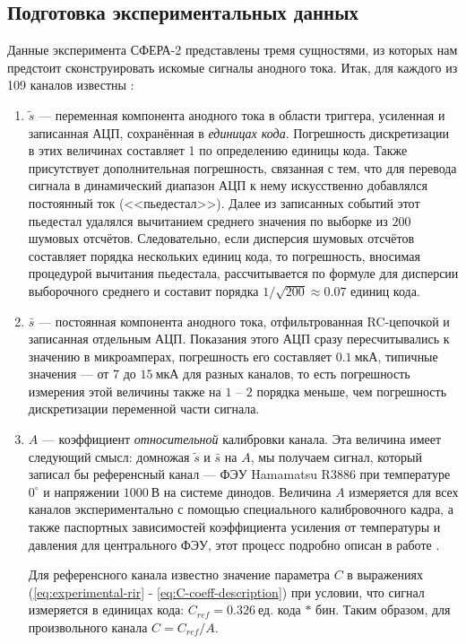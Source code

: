 \subsection{Подготовка экспериментальных данных}
\label{sec:expdata-preparation-for-deconvolution}

Данные эксперимента СФЕРА-2 представлены тремя сущностями, из которых нам предстоит сконструировать искомые сигналы анодного тока. Итак, для каждого из 109 каналов известны \cite{SphereDetector2020}:

\begin{enumerate}
	\item $\tilde{s}$ --- переменная компонента анодного тока в области триггера, усиленная и записанная АЦП, сохранённая в \textit{единицах кода}. Погрешность дискретизации в этих величинах составляет 1 по определению единицы кода. Также присутствует дополнительная погрешность, связанная с тем, что для перевода  сигнала в динамический диапазон АЦП к нему искусственно добавлялся постоянный ток (<<пьедестал>>). Далее из записанных событий этот пьедестал удалялся вычитанием среднего значения по выборке из $200$ шумовых отсчётов. Следовательно, если дисперсия шумовых отсчётов составляет порядка нескольких единиц кода, то погрешность, вносимая процедурой вычитания пьедестала, рассчитывается по формуле для дисперсии выборочного среднего и составит порядка $1 / \sqrt{200} \approx 0.07$ единиц кода.
	
	\item $\bar{s}$ --- постоянная компонента анодного тока, отфильтрованная RC-цепочкой и записанная отдельным АЦП. Показания этого АЦП сразу пересчитывались к значению в микроамперах, погрешность его составляет $0.1~\text{мкА}$, типичные значения --- от $7$ до $15~\text{мкА}$ для разных каналов, то есть погрешность измерения этой величины также на $1$ -- $2$ порядка меньше, чем погрешность дискретизации переменной части сигнала.
	
	\item $A$ --- коэффициент \textit{относительной} калибровки канала. Эта величина имеет следующий смысл: домножая $\tilde{s}$ и $\bar{s}$ на $A$, мы получаем сигнал, который записал бы референсный канал --- ФЭУ Hamamatsu R3886 при температуре $0^{\circ}$ и напряжении $1000~\text{В}$ на системе динодов. Величина $A$ измеряется для всех каналов экспериментально с помощью специального калибровочного кадра, а также паспортных зависимостей коэффициента усиления от температуры и давления для центрального ФЭУ, этот процесс подробно описан в работе \cite{SphereCalibration2016}. 
	
	Для референсного канала известно значение параметра $C$ в выражениях (\ref{eq:experimental-rir} - \ref{eq:C-coeff-description}) при условии, что сигнал измеряется в единицах кода: $C_{ref} = 0.326~\text{ед. кода} \, * \, \text{бин}$. Таким образом, для произвольного канала $C = C_{ref} / A$.
\end{enumerate}

